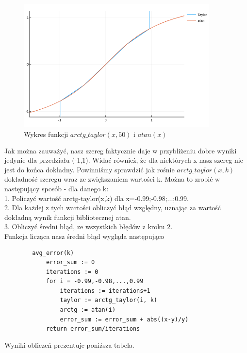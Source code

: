 \documentclass[11pt,a4paper]{article}
\begin{document}
    \begin{figure}[h]
        \centering
        \includegraphics[width=0.9\textwidth]{arctg_taylor}
        \caption{Wykres funkcji $arctg\_taylor(x,50)$ i $atan(x)$}
    \end{figure}

    Jak można zauważyć, nasz szereg faktycznie daje w przybliżeniu dobre wyniki jedynie dla przedziału (-1,1). Widać również, że dla niektórych x nasz szereg nie jest do końca dokładny. Powinniśmy sprawdzić jak rośnie $arctg\_taylor(x,k)$ dokładność szeregu wraz ze zwiększaniem wartości k. Można to zrobić w następujący sposób - dla danego k:\\
    1. Policzyć wartość arctg-taylor(x,k) dla x=-0.99;-0.98;...;0.99.\\
    2. Dla każdej z tych wartości obliczyć błąd względny, uznając za wartość dokładną wynik funkcji bibliotecznej atan.\\
    3. Obliczyć średni błąd, ze wszystkich błędów z kroku 2.\\

    Funkcja licząca nasz średni błąd wygląda następująco

    \begin{verbatim}
        avg_error(k)
            error_sum := 0
            iterations := 0
            for i = -0.99,-0.98,...,0.99
                iterations := iterations+1
                taylor := arctg_taylor(i, k)
                arctg := atan(i)
                error_sum := error_sum + abs((x-y)/y)
            return error_sum/iterations
    \end{verbatim}

    Wyniki obliczeń prezentuje poniższa tabela.\\
\end{document}
